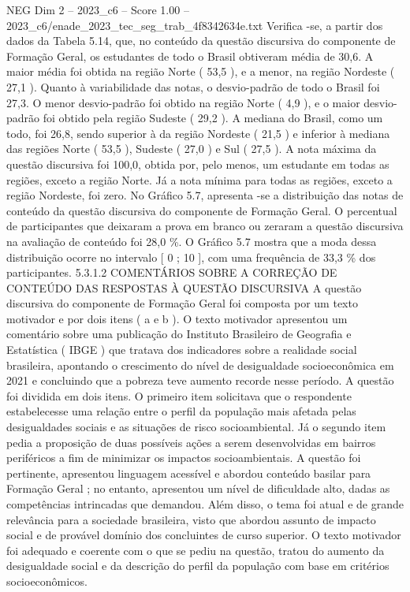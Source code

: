 \begin{textsample}{NEG Dim 2 – 2023\_c6 – Score 1.00 – 2023\_c6/enade\_2023\_tec\_seg\_trab\_4f8342634e.txt}
Verifica -se, a partir dos dados da Tabela 5.14, que, no conteúdo da questão discursiva do componente de Formação Geral, os estudantes de todo o Brasil obtiveram média de 30,6.
A maior média foi obtida na região Norte ( 53,5 ), e a menor, na região Nordeste ( 27,1 ).
Quanto à variabilidade das notas, o desvio-padrão de todo o Brasil foi 27,3.
O menor desvio-padrão foi obtido na região Norte ( 4,9 ), e o maior desvio-padrão foi obtido pela região Sudeste ( 29,2 ).
A mediana do Brasil, como um todo, foi 26,8, sendo superior à da região Nordeste ( 21,5 ) e inferior à mediana das regiões Norte ( 53,5 ), Sudeste ( 27,0 ) e Sul ( 27,5 ).
A nota máxima da questão discursiva foi 100,0, obtida por, pelo menos, um estudante em todas as regiões, exceto a região Norte.
Já a nota mínima para todas as regiões, exceto a região Nordeste, foi zero.
No Gráfico 5.7, apresenta -se a distribuição das notas de conteúdo da questão discursiva do componente de Formação Geral.
O percentual de participantes que deixaram a prova em branco ou zeraram a questão discursiva na avaliação de conteúdo foi 28,0 \%.
O Gráfico 5.7 mostra que a moda dessa distribuição ocorre no intervalo [ 0 ; 10 ], com uma frequência de 33,3 \% dos participantes. 5.3.1.2 COMENTÁRIOS SOBRE A CORREÇÃO DE CONTEÚDO DAS RESPOSTAS À QUESTÃO DISCURSIVA A questão discursiva do componente de Formação Geral foi composta por um texto motivador e por dois itens ( a e b ).
O texto motivador apresentou um comentário sobre uma publicação do Instituto Brasileiro de Geografia e Estatística ( IBGE ) que tratava dos indicadores sobre a realidade social brasileira, apontando o crescimento do nível de desigualdade socioeconômica em 2021 e concluindo que a pobreza teve aumento recorde nesse período.
A questão foi dividida em dois itens.
O primeiro item solicitava que o respondente estabelecesse uma relação entre o perfil da população mais afetada pelas desigualdades sociais e as situações de risco socioambiental.
Já o segundo item pedia a proposição de duas possíveis ações a serem desenvolvidas em bairros periféricos a fim de minimizar os impactos socioambientais.
A questão foi pertinente, apresentou linguagem acessível e abordou conteúdo basilar para Formação Geral ; no entanto, apresentou um nível de dificuldade alto, dadas as competências intrincadas que demandou.
Além disso, o tema foi atual e de grande relevância para a sociedade brasileira, visto que abordou assunto de impacto social e de provável domínio dos concluintes de curso superior.
O texto motivador foi adequado e coerente com o que se pediu na questão, tratou do aumento da desigualdade social e da descrição do perfil da população com base em critérios socioeconômicos.

\end{textsample}
